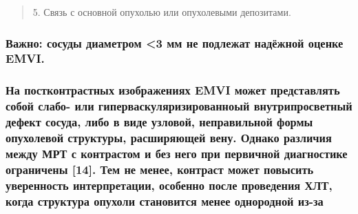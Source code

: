 \documentclass[
  russian,
  12pt,
  a4paper,
]{report}
\begin{document}
\begin{quote}
5. Связь с основной опухолью или опухолевыми депозитами.
\end{quote}

\subsubsection{Важно: сосуды диаметром \textless3 мм не подлежат
надёжной оценке
EMVI.}\label{ux432ux430ux436ux43dux43e-ux441ux43eux441ux443ux434ux44b-ux434ux438ux430ux43cux435ux442ux440ux43eux43c-3-ux43cux43c-ux43dux435-ux43fux43eux434ux43bux435ux436ux430ux442-ux43dux430ux434ux451ux436ux43dux43eux439-ux43eux446ux435ux43dux43aux435-emvi.}

\subsubsection{На постконтрастных изображениях EMVI может представлять
собой слабо- или гиперваскуляризированноый внутрипросветный дефект
сосуда, либо в виде узловой, неправильной формы опухолевой структуры,
расширяющей вену. Однако различия между МРТ с контрастом и без него при
первичной диагностике ограничены {[}14{]}. Тем не менее, контраст может
повысить уверенность интерпретации, особенно после проведения ХЛТ, когда
структура опухоли становится менее однородной из-за
}
\end{document}
